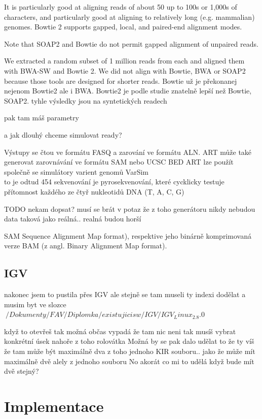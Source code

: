 \documentclass[czech,DP]{thesiskiv}
\numberwithin{equation}{section}
\begin{document}
 It is particularly good at aligning reads of about 50 up to 100s or 1,000s of characters, and particularly good at aligning to relatively long (e.g. mammalian) genomes.
  Bowtie 2 supports gapped, local, and paired-end alignment modes.

Note that SOAP2 and Bowtie do not permit gapped alignment of unpaired reads.

 We extracted a random subset of 1 million reads from each and aligned them with BWA-SW and Bowtie 2. We did not align with Bowtie, BWA or SOAP2 because those tools are designed for shorter reads.
Bowtie už je překonanej nejenom Bowtie2 ale i BWA.
Bowtie2 je podle studie znatelně lepší než Bowtie, SOAP2.
tyhle výsledky jsou na syntetických readech


pak tam máš parametry 

a jak dlouhý chceme simulovat ready? 

Výstupy se čtou ve formátu FASQ a zarování ve formátu ALN. 
ART může také generovat zarovnávání ve formátu SAM nebo UCSC BED
ART lze použít společně se simulátory varient genomů VarSim 
\\
to je odtud %
454 sekvenování je pyrosekvenování, které cycklicky testuje přítomnost každého ze čtyř nukleotidů DNA (T, A, C, G)


TODO nekam dopsat? musí se brát v potaz že z toho generátoru nikdy nebudou data taková jako reálná.. realná budou horší 


SAM Sequence Alignment Map format), respektive jeho binárně
komprimovaná verze BAM (z angl. Binary Alignment Map format).
\section{IGV}
nakonec jsem to pustila přes IGV ale stejně se tam museli ty indexi dodělat
a musim byt ve slozce 
$~/Dokumenty/FAV/Diplomka/existujicisw/IGV/IGV_Linux_2.8.0$

když to otevřeš tak možná občas vypadá že tam nic neni tak musíš vybrat konkrétní úsek nahoře z toho rolovátka
Možná by se pak dalo udělat to že ty víš že tam může být maximálně dva z toho jednoho KIR souboru.. jako že může mít maximálně dvě alely z jednoho souboru
No akorát co mi to udělá když bude mít dvě stejný? 

\chapter{Implementace}
\end{document}
